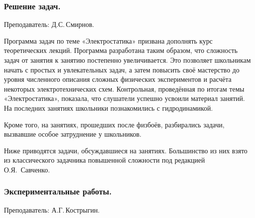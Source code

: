 \documentclass[12pt,a4paper,oneside,draft]{scrartcl}
\newlength{\h}
\newlength{\x}
\begin{document}
\subsubsection{Решение задач.}
\label{sec:daily_10_problems}

\textsf{Преподаватель: Д.С.\,Смирнов.}
\smallskip

Программа задач по теме «Электростатика» призвана дополнять курс
теоретических лекций. Программа разработана таким образом, что
сложность задач от занятия к занятию постепенно увеличивается. Это
позволяет школьникам начать с простых и увлекательных задач, а затем
повысить своё мастерство до уровня численного описания сложных
физических экспериментов и расчёта некоторых электротехнических
схем. Контрольная, проведённая по итогам темы «Электростатика»,
показала, что слушатели успешно усвоили материал занятий. На последних
занятиях школьники познакомились с гидродинамикой.

Кроме того, на занятиях, прошедших после физбоёв, разбирались задачи,
вызвавшие особое затруднение у школьников. 

Ниже приводятся задачи, обсуждавшиеся на занятиях. Большинство из них
взято из классического задачника повышенной сложности под редакцией
О.Я.~Савченко. 










\parindent=5mm

\subsubsection{Экспериментальные работы.}
\label{sec:daily_10_exp}

\textsf{Преподаватель: А.Г.\,Кострыгин.}
\end{document}
